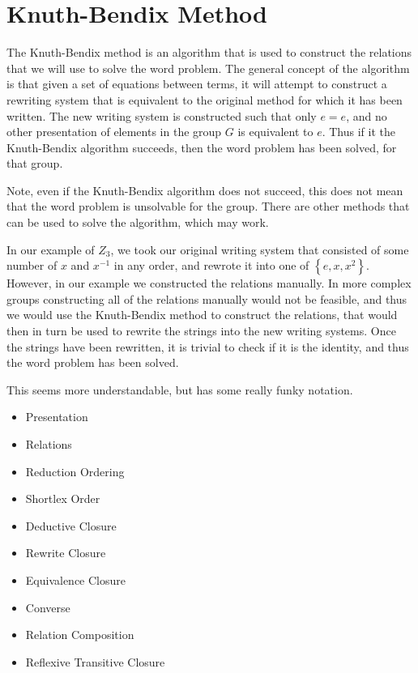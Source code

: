 \documentclass[10pt]{amsart}
\theoremstyle{definition}
\begin{document}
\section{Knuth-Bendix Method}%
\label{sec:kunth_bendix_method}

The Knuth-Bendix method is an algorithm that is used to construct the relations
that we will use to solve the word problem. The general concept of the
algorithm is that given a set of equations between terms, it will attempt to
construct a rewriting system that is equivalent to the original method for
which it has been written. The new writing system is constructed such that only
$e=e$, and no other presentation of elements in the group $G$ is equivalent to
$e$. Thus if it the Knuth-Bendix algorithm succeeds, then the word problem has
been solved, for that group.

Note, even if the Knuth-Bendix algorithm does not succeed, this does not mean
that the word problem is unsolvable for the group. There are other methods that
can be used to solve the algorithm, which may work.

In our example of $Z_3$, we took our original writing system that consisted of
some number of $x$ and $x^{-1}$ in any order, and rewrote it into one of
$\left\{e, x, x^2\right\}$. However, in our example we constructed the
relations manually. In more complex groups constructing all of the relations
manually would not be feasible, and thus we would use the Knuth-Bendix method
to construct the relations, that would then in turn be used to rewrite the
strings into the new writing systems. Once the strings have been rewritten, it
is trivial to check if it is the identity, and thus the word problem has been
solved.

This seems more understandable, but has some really funky notation.
\begin{multicols}{2}
  \begin{itemize}
    \item Presentation
    \item Relations
    \item Reduction Ordering
    \item Shortlex Order
    \item Deductive Closure
    \item Rewrite Closure
    \item Equivalence Closure
    \item Converse
    \item Relation Composition
    \item Reflexive Transitive Closure
  \end{itemize}
\end{multicols}

\nocite{*}


\end{document}
